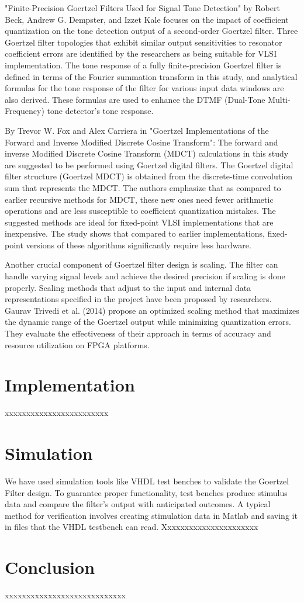 \documentclass{article}
\begin{document}
"Finite-Precision Goertzel Filters Used for Signal Tone Detection" by Robert Beck, Andrew G. Dempster, and Izzet Kale focuses on the impact of coefficient quantization on the tone detection output of a second-order Goertzel filter. Three Goertzel filter topologies that exhibit similar output sensitivities to resonator coefficient errors are identified by the researchers as being suitable for VLSI implementation. The tone response of a fully finite-precision Goertzel filter is defined in terms of the Fourier summation transform in this study, and analytical formulas for the tone response of the filter for various input data windows are also derived. These formulas are used to enhance the DTMF (Dual-Tone Multi-Frequency) tone detector's tone response.

By Trevor W. Fox and Alex Carriera in "Goertzel Implementations of the Forward and Inverse Modified Discrete Cosine Transform":
The forward and inverse Modified Discrete Cosine Transform (MDCT) calculations in this study are suggested to be performed using Goertzel digital filters. The Goertzel digital filter structure (Goertzel MDCT) is obtained from the discrete-time convolution sum that represents the MDCT. The authors emphasize that as compared to earlier recursive methods for MDCT, these new ones need fewer arithmetic operations and are less susceptible to coefficient quantization mistakes. The suggested methods are ideal for fixed-point VLSI implementations that are inexpensive. The study shows that compared to earlier implementations, fixed-point versions of these algorithms significantly require less hardware.

Another crucial component of Goertzel filter design is scaling. The filter can handle varying signal levels and achieve the desired precision if scaling is done properly. Scaling methods that adjust to the input and internal data representations specified in the project have been proposed by researchers. Gaurav Trivedi et al. (2014) propose an optimized scaling method that maximizes the dynamic range of the Goertzel output while minimizing quantization errors. They evaluate the effectiveness of their approach in terms of accuracy and resource utilization on FPGA platforms.

\section{Implementation}
xxxxxxxxxxxxxxxxxxxxxxxx

\section{Simulation}
We have used simulation tools like VHDL test benches to validate the Goertzel Filter design. To guarantee proper functionality, test benches produce stimulus data and compare the filter's output with anticipated outcomes. A typical method for verification involves creating stimulation data in Matlab and saving it in files that the VHDL testbench can read.
Xxxxxxxxxxxxxxxxxxxxxx

\section{Conclusion}
xxxxxxxxxxxxxxxxxxxxxxxxxxxx
\end{document}

